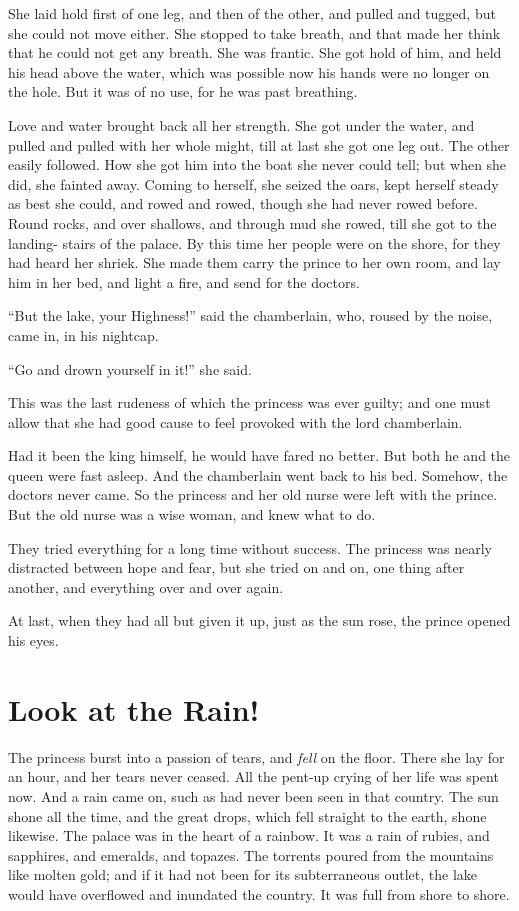 \documentclass[12pt]{memoir}
\begin{document}
She laid hold first of one leg, and then of the other, and pulled and
tugged, but she could not move either.  She stopped to take breath,
and that made her think that he could not get any breath.  She was
frantic.  She got hold of him, and held his head above the water,
which was possible now his hands were no longer on the hole.  But it
was of no use, for he was past breathing.

Love and water brought back all her strength.  She got under the
water, and pulled and pulled with her whole might, till at last she
got one leg out.  The other easily followed.  How she got him into the
boat she never could tell; but when she did, she fainted away.  Coming
to herself, she seized the oars, kept herself steady as best she
could, and rowed and rowed, though she had never rowed before.  Round
rocks, and over shallows, and through mud she rowed, till she got to
the landing- stairs of the palace.  By this time her people were on
the shore, for they had heard her shriek.  She made them carry the
prince to her own room, and lay him in her bed, and light a fire, and
send for the doctors.

``But the lake, your Highness!'' said the chamberlain, who, roused by
the noise, came in, in his nightcap.

``Go and drown yourself in it!'' she said.

This was the last rudeness of which the princess was ever guilty; and
one must allow that she had good cause to feel provoked with the lord
chamberlain.

Had it been the king himself, he would have fared no better.  But both
he and the queen were fast asleep.  And the chamberlain went back to
his bed.  Somehow, the doctors never came.  So the princess and her
old nurse were left with the prince.  But the old nurse was a wise
woman, and knew what to do.

They tried everything for a long time without success.  The princess
was nearly distracted between hope and fear, but she tried on and on,
one thing after another, and everything over and over again.

At last, when they had all but given it up, just as the sun rose, the
prince opened his eyes.



\chapter{Look at the Rain!}


The princess burst into a passion of tears, and \emph{fell} on the
floor.  There she lay for an hour, and her tears never ceased.  All
the pent-up crying of her life was spent now.  And a rain came on,
such as had never been seen in that country.  The sun shone all the
time, and the great drops, which fell straight to the earth, shone
likewise.  The palace was in the heart of a rainbow.  It was a rain of
rubies, and sapphires, and emeralds, and topazes.  The torrents poured
from the mountains like molten gold; and if it had not been for its
subterraneous outlet, the lake would have overflowed and inundated the
country.  It was full from shore to shore.
\end{document}
